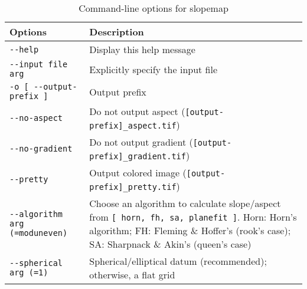 \begin{longtable}{|l|p{11cm}|} 
\caption{Command-line options for slopemap}
\label{tbl:slopemap}
\endfirsthead
\endhead
\endfoot
\endlastfoot
\hline
Options & Description\\ \hline \hline
\verb#--help# & Display this help message\\ \hline
\verb#--input file arg# & Explicitly specify the input file\\ \hline
\verb#-o [ --output-prefix ]# & Output prefix\\ \hline
\verb#--no-aspect# & Do not output aspect (\verb#[output-prefix]_aspect.tif#)\\ \hline
\verb#--no-gradient# & Do not output gradient (\verb#[output-prefix]_gradient.tif#)\\ \hline
\verb#--pretty# & Output colored image (\verb#[output-prefix]_pretty.tif#)\\ \hline
\verb#--algorithm arg (=moduneven)# & Choose an algorithm to calculate slope/aspect from \verb#[ horn, fh, sa, planefit ]#. Horn: Horn's algorithm; FH: Fleming \& Hoffer's (rook's case); SA: Sharpnack \& Akin's (queen's case)\\ \hline
\verb#--spherical arg (=1)# & Spherical/elliptical datum (recommended); otherwise, a flat grid\\ \hline
\end{longtable}

